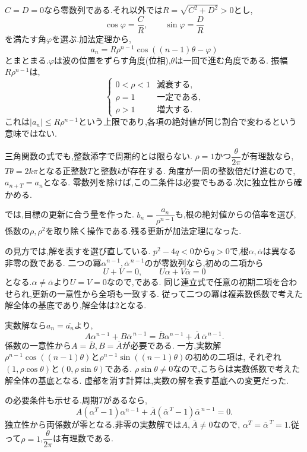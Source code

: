$C=D=0$なら零数列である.それ以外では$R=\sqrt{C^2+D^2}>0$とし,
\[
  \cos\varphi=\frac CR,\qquad \sin\varphi=\frac DR
\]
を満たす角$\varphi$を選ぶ.加法定理から,
\[
  a_n=R\rho^{n-1}\cos((n-1)\theta-\varphi)
\]
とまとまる.$\varphi$は波の位置をずらす角度(位相),$\theta$は一回で進む角度である.
振幅$R\rho^{n-1}$は,
\[
  \begin{cases}
    0<\rho<1 & \text{減衰する},\\
    \rho=1 & \text{一定である},\\
    \rho>1 & \text{増大する}.
  \end{cases}
\]
これは$|a_n|\le R\rho^{n-1}$という上限であり,各項の絶対値が同じ割合で変わるという意味ではない.

三角関数の式でも,整数添字で周期的とは限らない.
$\rho=1$かつ$\dfrac{\theta}{2\pi}$が有理数なら,$T\theta=2k\pi$となる正整数$T$と整数$k$が存在する.
角度が一周の整数倍だけ進むので,$a_{n+T}=a_n$となる.
零数列を除けば,この二条件は必要でもある.次に独立性から確かめる.

\label{解釈：虚数解と基本解}
では,目標の更新に合う量を作った.
$b_n=\dfrac{a_n}{\rho^{n-1}}$も,根の絶対値からの倍率を選び,
係数の$\rho,\rho^2$を取り除く操作である.残る更新が加法定理になった.

の見方では,解を表すを選び直している.
$p^2-4q<0$から$q>0$で,根$\alpha,\overline\alpha$は異なる非零の数である.
二つの冪$\alpha^{n-1},\overline\alpha^{\,n-1}$のが零数列なら,初めの二項から
\[
  U+V=0,\qquad U\alpha+V\overline\alpha=0
\]
となる.$\alpha\ne\overline\alpha$より$U=V=0$なので,である.
同じ連立式で任意の初期二項を合わせられ,更新の一意性から全項も一致する.
従って二つの冪は複素数係数で考えた解全体の基底であり,解全体は2となる.

実数解なら$a_n=\overline{a_n}$より,
\[
  A\alpha^{n-1}+B\overline\alpha^{\,n-1}
  =\overline B\alpha^{n-1}+\overline A\,\overline\alpha^{\,n-1}.
\]
係数の一意性から$A=\overline B,B=\overline A$が必要である.
一方,実数解$\rho^{n-1}\cos((n-1)\theta)$と$\rho^{n-1}\sin((n-1)\theta)$の初めの二項は,
それぞれ$(1,\rho\cos\theta)$と$(0,\rho\sin\theta)$である.
$\rho\sin\theta\ne0$なので,こちらは実数係数で考えた解全体の基底となる.
虚部を消す計算は,実数の解を表す基底への変更だった.

の必要条件も示せる.周期$T$があるなら,
\[
  A(\alpha^T-1)\alpha^{n-1}
  +\overline A(\overline\alpha^{\,T}-1)\overline\alpha^{\,n-1}=0.
\]
独立性から両係数が零となる.非零の実数解では$A,\overline A\ne0$なので,
$\alpha^T=\overline\alpha^{\,T}=1$.従って$\rho=1$,$\dfrac{\theta}{2\pi}$は有理数である.

